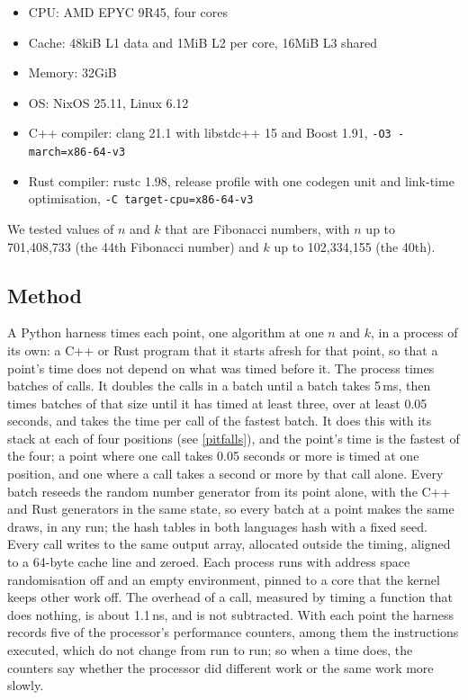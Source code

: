 \documentclass[letterpaper,11pt]{article}
\begin{document}
\begin{itemize}
    \item CPU: AMD EPYC 9R45, four cores
    \item Cache: 48kiB L1 data and 1MiB L2 per core, 16MiB L3 shared
    \item Memory: 32GiB
    \item OS: NixOS 25.11, Linux 6.12
    \item C++ compiler: clang 21.1 with libstdc++ 15 and Boost 1.91,
    \verb|-O3 -march=x86-64-v3|
    \item Rust compiler: rustc 1.98, release profile with one codegen
    unit and link-time optimisation, \verb|-C target-cpu=x86-64-v3|
\end{itemize}

We tested values of \(n\) and \(k\) that are Fibonacci numbers, with
\(n\) up to 701,408,733 (the 44th Fibonacci number) and \(k\) up to
102,334,155 (the 40th).

\subsection{Method}

A Python harness times each point, one algorithm at one \(n\) and
\(k\), in a process of its own: a C++ or Rust program that it starts
afresh for that point, so that a point's time does not depend on what
was timed before it. The process times batches of calls. It doubles the
calls in a batch until a batch takes 5\,ms, then times batches of that
size until it has timed at least three, over at least 0.05 seconds, and
takes the time per call of the fastest batch. It does this with its
stack at each of four positions (see \autoref{pitfalls}), and the
point's time is the fastest of the four; a point where one call takes
0.05 seconds or more is timed at one position, and one where a call
takes a second or more by that call alone. Every batch reseeds the
random number generator from its point alone, with the C++ and Rust
generators in the same state, so every batch at a point makes the same
draws, in any run; the hash tables in both languages hash with a fixed
seed. Every call writes to the same output array, allocated outside the
timing, aligned to a 64-byte cache line and zeroed. Each process runs
with address space randomisation off and an empty environment, pinned
to a core that the kernel keeps other work off. The overhead of a call,
measured by timing a function that does nothing, is about 1.1\,ns, and
is not subtracted. With each point the harness records five of the
processor's performance counters, among them the instructions executed,
which do not change from run to run; so when a time does, the counters
say whether the processor did different work or the same work more
slowly.
\end{document}
